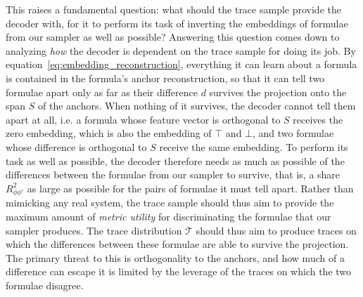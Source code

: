 \documentclass[titlepage,a4paper,11pt]{report}
\begin{document}
    This raises a fundamental question: what should the trace sample provide the decoder with, for it to perform its task of inverting the embeddings of formulae from our sampler as well as possible? Answering this question comes down to analyzing \emph{how} the decoder is dependent on the trace sample for doing its job. By equation~\eqref{eq:embedding_reconstruction}, everything it can learn about a formula is contained in the formula's anchor reconstruction, so that it can tell two formulae apart only as far as their difference $d$ survives the projection onto the span $S$ of the anchors. When nothing of it survives, the decoder cannot tell them apart at all, i.e. a formula whose feature vector is orthogonal to $S$ receives the zero embedding, which is also the embedding of $\top$ and $\bot$, and two formulae whose difference is orthogonal to $S$ receive the same embedding. To perform its task as well as possible, the decoder therefore needs as much as possible of the differences between the formulae from our sampler to survive, that is, a share $R^2_{\phi\phi'}$ as large as possible for the pairs of formulae it must tell apart. Rather than mimicking any real system, the trace sample should thus aim to provide the maximum amount of \emph{metric utility} for discriminating the formulae that our sampler produces. The trace distribution $\mathcal{T}$ should thus aim to produce traces on which the differences between these formulae are able to survive the projection. The primary threat to this is orthogonality to the anchors, and how much of a difference can escape it is limited by the leverage of the traces on which the two formulae disagree.
 
\end{document}
